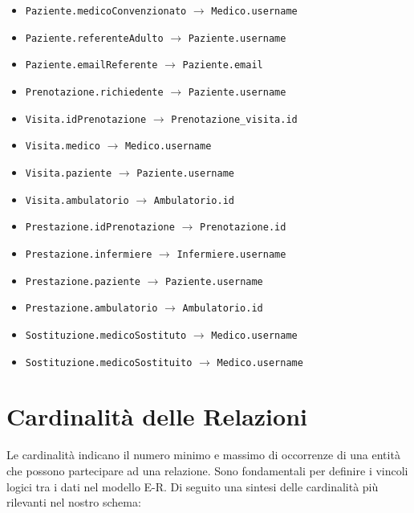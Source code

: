 \documentclass[a4paper,12pt]{article}
\begin{document}
\begin{itemize}
    \item \texttt{Paziente.medicoConvenzionato} $\rightarrow$ \texttt{Medico.username}
    \item \texttt{Paziente.referenteAdulto} $\rightarrow$ \texttt{Paziente.username}
    \item \texttt{Paziente.emailReferente} $\rightarrow$ \texttt{Paziente.email}
    \item \texttt{Prenotazione.richiedente} $\rightarrow$ \texttt{Paziente.username}
    \item \texttt{Visita.idPrenotazione} $\rightarrow$ \texttt{Prenotazione_visita.id}
    \item \texttt{Visita.medico} $\rightarrow$ \texttt{Medico.username}
    \item \texttt{Visita.paziente} $\rightarrow$ \texttt{Paziente.username}
    \item \texttt{Visita.ambulatorio} $\rightarrow$ \texttt{Ambulatorio.id}
    \item \texttt{Prestazione.idPrenotazione} $\rightarrow$ \texttt{Prenotazione.id}
    \item \texttt{Prestazione.infermiere} $\rightarrow$ \texttt{Infermiere.username}
    \item \texttt{Prestazione.paziente} $\rightarrow$ \texttt{Paziente.username}
    \item \texttt{Prestazione.ambulatorio} $\rightarrow$ \texttt{Ambulatorio.id}
    \item \texttt{Sostituzione.medicoSostituto} $\rightarrow$ \texttt{Medico.username}
    \item \texttt{Sostituzione.medicoSostituito} $\rightarrow$ \texttt{Medico.username}
\end{itemize}
\newpage
\section{Cardinalità delle Relazioni}

Le cardinalità indicano il numero minimo e massimo di occorrenze di una entità che possono partecipare ad una relazione. Sono fondamentali per definire i vincoli logici tra i dati nel modello E-R. Di seguito una sintesi delle cardinalità più rilevanti nel nostro schema:
\end{document}
